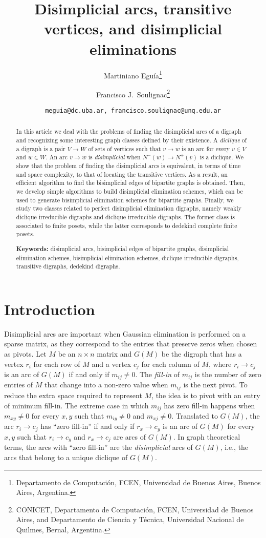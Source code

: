 \documentclass[a4paper,11pt]{article}
\title{Disimplicial arcs, transitive vertices, and disimplicial eliminations}
\author{Martiniano Eguía\thanks{Departamento de Computaci\'on, FCEN, Universidad de Buenos Aires, 
Buenos Aires, Argentina.} \and Francisco J.\ Soulignac\thanks{CONICET, Departamento de Computaci\'on, FCEN, Universidad de Buenos Aires, and Departamento de Ciencia y Técnica, Universidad Nacional de Quilmes, Bernal, Argentina.}}
\date{\normalsize\texttt{meguia@dc.uba.ar, francisco.soulignac@unq.edu.ar}}
\begin{document}
\maketitle

\begin{abstract}
 In this article we deal with the problems of finding the disimplicial arcs of a digraph and recognizing some interesting graph classes defined by their existence.  A \emph{diclique} of a digraph is a pair $V \to W$ of sets of vertices such that $v \to w$ is an arc for every $v \in V$ and $w \in W$.  An arc $v \to w$ is \emph{disimplicial} when $N^-(w) \to N^+(v)$ is a diclique.  We show that the problem of finding the disimplicial arcs is equivalent, in terms of time and space complexity, to that of locating the transitive vertices.  As a result, an efficient algorithm to find the bisimplicial edges of bipartite graphs is obtained.  Then, we develop simple algorithms to build disimplicial elimination schemes, which can be used to generate bisimplicial elimination schemes for bipartite graphs.  Finally, we study two classes related to perfect disimplicial elimination digraphs, namely weakly diclique irreducible digraphs and diclique irreducible digraphs.  The former class is associated to finite posets, while the latter corresponds to dedekind complete finite posets.

 \vspace*{.2\baselineskip} {\bf Keywords:} disimplicial arcs, bisimplicial edges of bipartite graphs, disimplicial elimination schemes, bisimplicial elimination schemes, diclique irreducible digraphs, transitive digraphs, dedekind digraphs.
\end{abstract}


\section{Introduction}

Disimplicial arcs are important when Gaussian elimination is performed on a sparse matrix, as they correspond to the entries that preserve zeros when chosen as pivots.  Let $M$ be an $n\times n$ matrix and $G(M)$ be the digraph that has a vertex $r_i$ for each row of $M$ and a vertex $c_j$ for each column of $M$, where $r_i \to c_j$ is an arc of $G(M)$ if and only if $m_{ij} \neq 0$.  The \emph{fill-in} of $m_{ij}$ is the number of zero entries of $M$ that change into a non-zero value when $m_{ij}$ is the next pivot.  To reduce the extra space required to represent $M$, the idea is to pivot with an entry of minimum fill-in.   The extreme case in which $m_{ij}$ has zero fill-in happens when $m_{xy} \neq 0$ for every $x,y$ such that $m_{iy} \neq 0$ and $m_{xj} \neq 0$.  Translated to $G(M)$, the arc $r_i \to c_j$ has ``zero fill-in'' if and only if $r_x \to c_y$ is an arc of $G(M)$ for every $x,y$ such that $r_i \to c_y$ and $r_x \to c_j$ are arcs of $G(M)$.  In graph theoretical terms, the arcs with ``zero fill-in'' are the \emph{disimplicial} arcs of $G(M)$, i.e., the arcs that belong to a unique diclique of $G(M)$.
\end{document}

